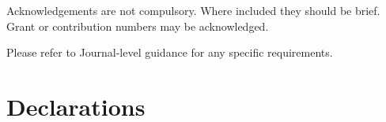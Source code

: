 \documentclass[pdflatex,sn-mathphys-num]{sn-jnl}%
\theoremstyle{thmstyleone}%
\theoremstyle{thmstyletwo}%
\theoremstyle{thmstylethree}%
\begin{document}


Acknowledgements are not compulsory. Where included they should be brief. Grant or contribution numbers may be acknowledged.

Please refer to Journal-level guidance for any specific requirements.

\section*{Declarations}











\end{document}
